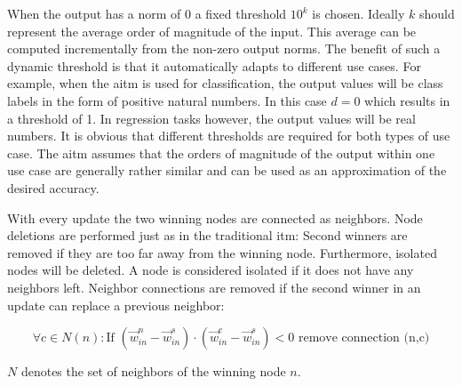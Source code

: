When the output has a norm of $0$ a fixed threshold $10^k$ is chosen. Ideally $k$ should represent the average order of magnitude of the input. This average can be computed incrementally from the non-zero output norms. The benefit of such a dynamic threshold is that it automatically adapts to different use cases. For example, when the \gls{aitm} is used for classification, the output values will be class labels in the form of positive natural numbers. In this case $d=0$ which results in a threshold of 1. In regression tasks however, the output values will be real numbers. It is obvious that different thresholds are required for both types of use case. The \gls{aitm} assumes that the orders of magnitude of the output within one use case are generally rather similar and can be used as an approximation of the desired accuracy.

With every update the two winning nodes are connected as neighbors. Node deletions are performed just as in the traditional \gls{itm}: Second winners are removed if they are too far away from the winning node. Furthermore, isolated nodes will be deleted. A node is considered isolated if it does not have any neighbors left. Neighbor connections are removed if the second winner in an update can replace a previous neighbor:

\begin{equation}
\forall c \in N(n): \text{If~} (\vec{w}^n_{in}-\vec{w}^s_{in}) \cdot (\vec{w}^c_{in}-\vec{w}^s_{in}) < 0 \text{~remove connection (n,c)}
\end{equation}

$N$ denotes the set of neighbors of the winning node $n$.

